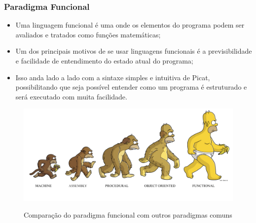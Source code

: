 \begin{frame}[fragile]
	\frametitle{Paradigma Funcional}
    
    \begin{itemize}
    
    	\item Uma linguagem funcional é uma onde os elementos do programa podem ser avaliados e 
        tratados como funções matemáticas;
        
         \item Um dos principais motivos de se usar linguagens funcionais é a previsibilidade
         e facilidade de entendimento do estado atual do programa;
         
         \item Isso anda lado a lado com a sintaxe simples e intuitiva de Picat, possibilitando
         que seja possível entender como um programa é estruturado e será executado com muita
         facilidade.
         
    \end{itemize}
    
    \begin{figure}
    	\vspace*{-3mm}
        \centering
        \caption{Comparação do paradigma funcional com outros paradigmas comuns}
        \includegraphics[width=.7\textwidth] {figures/Paradigma_Funcional.png}
        \label{Paradigma Funcional}
    \end{figure}
    
\end{frame}


